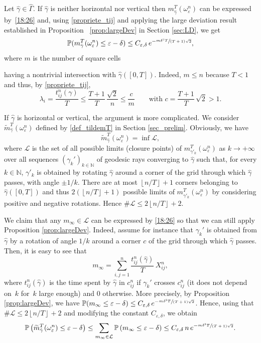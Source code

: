 \documentclass[10pt]{amsart}
\def\N{\mathbb{N}}
\theoremstyle{definition}
\begin{document}
Let $\hat \gamma\in\hat \Gamma$.
{If $\hat \gamma$ is neither horizontal nor vertical then $m_{\hat \gamma}^T(\omega_\varepsilon^n) $ can be expressed by~\eqref{18:26} and, using \eqref{propriete_tij} and} applying the large deviation result established in Proposition~ \ref{prop:largeDev} in Section \ref{sec:LD}, we get
\[
\mathbb{P}( m_{\hat \gamma}^T(\omega_\varepsilon^n) \leq \varepsilon-\delta) \leq C_{\varepsilon, \delta} \, {e^{-\sfrac{m \delta^2 T}{(T+1)\sqrt{2}}} },
\]
where $m$ is the number of square cells {having a nontrivial intersection with $\hat \gamma([0,T])$. Indeed, $m\leq n$ because $T<1$ and thus, by \eqref{propriete_tij},
\[
\lambda_i = \frac{t_{ij}^n(\gamma)}{T} \leq \frac{T+1}{T}\,\frac{\sqrt{2}}{n} \leq \frac{c}{m}\qquad\text{with }c=\frac{T+1}{T}\,\sqrt{2} > 1.
\]

If $\hat \gamma$ is horizontal or vertical, the argument is more complicated.
We consider $\widetilde m^T_{\hat \gamma}(\omega_\varepsilon^n)$ defined by \eqref{def_tildemT} in Section \ref{sec_prelim}. Obviously, we have
\[
\widetilde m^T_{\hat \gamma}(\omega_\varepsilon^n) = \inf \mathcal{L},
\]
where $\mathcal{L}$ is the set of all possible limits (closure points) of $m^T_{\gamma'_k}(\omega_\varepsilon^n)$ as $k\rightarrow+\infty$ over all sequences $(\gamma_k')_{k\in \N}$ of geodesic rays converging to $\hat \gamma$ such that, for every $k\in\N$, $\gamma'_k$ is obtained by rotating $\hat \gamma$ around a corner of the grid through which $\hat \gamma$ passes, with angle $\pm 1/k$.
There are at most $\left \lfloor n/T\right \rfloor +1$ corners belonging to $\hat \gamma([0,T])$ and thus $2(\left \lfloor n/T\right \rfloor+1)$ possible limits of $m^T_{\gamma'_k}(\omega_\varepsilon^n)$ by considering positive and negative rotations. Hence $\#\mathcal{L} \leq 2\left \lfloor n/T\right \rfloor+2$.

We claim that any $m_\infty\in\mathcal{L}$ can be expressed by \eqref{18:26} so that we can still apply Proposition \ref{prop:largeDev}. Indeed, assume for instance that $\gamma_k'$ is obtained from $\hat \gamma$ by a rotation of angle $1/k$ around a corner $c$ of the grid through which $\hat \gamma$ passes.
Then, it is easy to see that
\[
m_\infty = \sum_{i,j=1}^n \frac{t_{ij}^n(\hat \gamma)}{T}\, X_{ij}^n,
\]
where $t_{ij}^n(\hat \gamma)$ is the time spent by $\hat\gamma$ in $c_{ij}^n$ if $\gamma_k'$ crosses $c_{ij}^n$ (it does not depend on~$k$ for~$k$ large enough) and $0$ otherwise. More precisely, by Proposition \ref{prop:largeDev}, we have
\hbox{$\mathbb{P}( m_\infty \leq \varepsilon-\delta) \leq C_{\varepsilon, \delta} \, {e^{-\sfrac{m \delta^2 T}{(T+1)\sqrt{2}}}}$}.
Hence, using that $\#\mathcal{L} \leq 2\left \lfloor n/T\right \rfloor+2$ and modifying the constant $ C_{\varepsilon, \delta}$, we obtain
\[
\mathbb{P}\left( \widetilde m_{\hat \gamma}^T(\omega_\varepsilon^n ) \leq \varepsilon-\delta \right)
\leq \sum_{m_\infty \in \mathcal{L}} \mathbb{P}\left(m_\infty \leq \varepsilon-\delta \right) \leq C_{\varepsilon, \delta} \, n \, {e^{-\sfrac{m \delta^2 T}{(T+1)\sqrt{2}}} }.
\]

}
\end{document}
